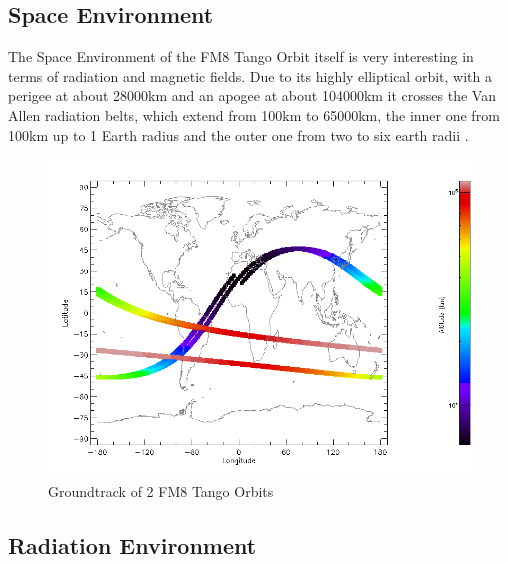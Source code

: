 \subsection{Space Environment}
The Space Environment of the FM8 Tango Orbit itself is very interesting in terms of radiation and magnetic fields. Due to its highly elliptical orbit, with a perigee at about 28000km and an apogee at about 104000km it crosses the Van Allen radiation belts, which extend from 100km to 65000km, the inner one from 100km up to 1 Earth radius and the outer one from two to six earth radii \citep{ecss:10-04C}.
\begin{figure}[h]
	\centering
	\includegraphics[width=\linewidth-5em]{spenvis/worldmap_2_orb}
		\caption{Groundtrack of 2 FM8 Tango Orbits}
	\label{fig:worldmap}
\end{figure}



\subsection{Radiation Environment}

